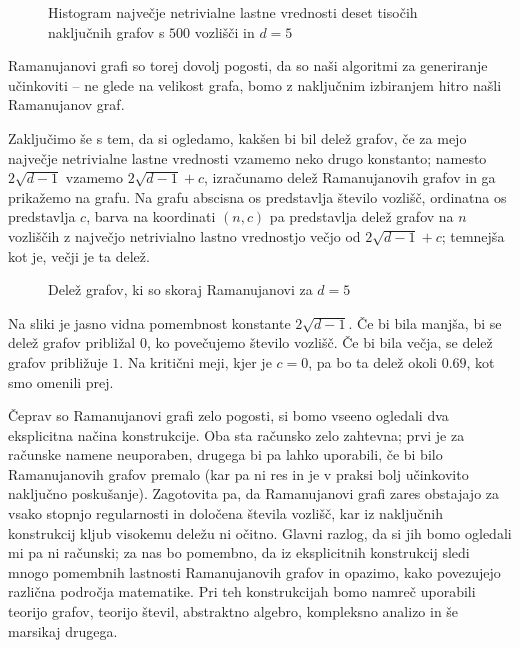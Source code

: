\begin{figure}[H]
    \begin{center}
        
    \end{center}
    \caption{Histogram največje netrivialne lastne vrednosti deset tisočih naključnih grafov s \(500\) vozlišči in \(d=5\)}
\end{figure}

Ramanujanovi grafi so torej dovolj pogosti, da so naši algoritmi za generiranje učinkoviti -- ne glede na velikost grafa, bomo z naključnim izbiranjem hitro našli Ramanujanov graf.

Zaključimo še s tem, da si ogledamo, kakšen bi bil delež grafov, če za mejo največje netrivialne lastne vrednosti vzamemo neko drugo konstanto; namesto \(2\sqrt{d-1}\) vzamemo \(2\sqrt{d-1} + c\), izračunamo delež Ramanujanovih grafov in ga prikažemo na grafu. Na grafu abscisna os predstavlja število vozlišč, ordinatna os predstavlja \(c\), barva na koordinati \((n,c)\) pa predstavlja delež grafov na \(n\) vozliščih z največjo netrivialno lastno vrednostjo večjo od \(2\sqrt{d-1}+c\); temnejša kot je, večji je ta delež.
\begin{figure}[H]
    \begin{center}
        
    \end{center}
    \caption{Delež grafov, ki so skoraj Ramanujanovi za \(d=5\)}
\end{figure}
Na sliki je jasno vidna pomembnost konstante \(2\sqrt{d-1}\). Če bi bila manjša, bi se delež grafov približal \(0\), ko povečujemo število vozlišč. Če bi bila večja, se delež grafov približuje \(1\). Na kritični meji, kjer je \(c=0\), pa bo ta delež okoli \(0.69\), kot smo omenili prej.

Čeprav so Ramanujanovi grafi zelo pogosti, si bomo vseeno ogledali dva eksplicitna načina konstrukcije. Oba sta računsko zelo zahtevna; prvi je za računske namene neuporaben, drugega bi pa lahko uporabili, če bi bilo Ramanujanovih grafov premalo (kar pa ni res in je v praksi bolj učinkovito naključno poskušanje). Zagotovita pa, da Ramanujanovi grafi zares obstajajo za vsako stopnjo regularnosti in določena števila vozlišč, kar iz naključnih konstrukcij kljub visokemu deležu ni očitno. Glavni razlog, da si jih bomo ogledali mi pa ni računski; za nas bo pomembno, da iz eksplicitnih konstrukcij sledi mnogo pomembnih lastnosti Ramanujanovih grafov in opazimo, kako povezujejo različna področja matematike. Pri teh konstrukcijah bomo namreč uporabili teorijo grafov, teorijo števil, abstraktno algebro, kompleksno analizo in še marsikaj drugega.

